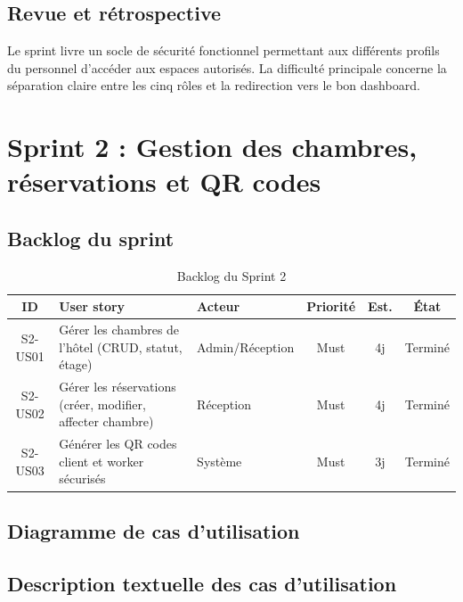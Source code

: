 \subsection{Revue et rétrospective}
Le sprint livre un socle de sécurité fonctionnel permettant aux différents profils du personnel d'accéder aux espaces autorisés. La difficulté principale concerne la séparation claire entre les cinq rôles et la redirection vers le bon dashboard.


\section{Sprint 2 : Gestion des chambres, réservations et QR codes}
\label{sec:sprint2}

\subsection{Backlog du sprint}
\begin{table}[H]
\centering
\caption{Backlog du Sprint 2}
\small
\begin{tabularx}{\textwidth}{|c|X|p{2.2cm}|c|c|c|}
\hline
\textbf{ID} & \textbf{User story} & \textbf{Acteur} & \textbf{Priorité} & \textbf{Est.} & \textbf{État} \\ \hline
S2-US01 & Gérer les chambres de l'hôtel (CRUD, statut, étage) & Admin/Réception & Must & 4j & Terminé \\ \hline
S2-US02 & Gérer les réservations (créer, modifier, affecter chambre) & Réception & Must & 4j & Terminé \\ \hline
S2-US03 & Générer les QR codes client et worker sécurisés & Système & Must & 3j & Terminé \\ \hline
\end{tabularx}
\end{table}

\subsection{Diagramme de cas d'utilisation}

\subsection{Description textuelle des cas d'utilisation}

